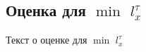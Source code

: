 \subsection{\texorpdfstring{Оценка для $\min$ $l^{\tau}_{x}$}{Оценка для min lτx}}
Текст о оценке для $\min$ $l^{\tau}_{x}$
